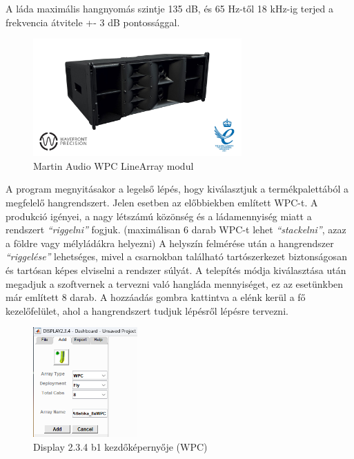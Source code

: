 A láda maximális hangnyomás szintje 135 dB, és 65 Hz-től 18 kHz-ig terjed a frekvencia átvitele +- 3 dB pontossággal. \cite{WPCUSERGUIDE}
\begin{figure}[H]
	\centering
	\includegraphics[width=80mm, keepaspectratio]{figures/wpc_front_view.jpg}
	\caption{Martin Audio WPC LineArray modul}\label{fig:wpc}
\end{figure}
A program megnyitásakor a legelső lépés, hogy kiválasztjuk a termékpalettából a megfelelő hangrendszert.
Jelen esetben az előbbiekben említett WPC-t. A produkció igényei, a nagy létszámú közönség és a ládamennyiség miatt a rendszert
\textit{``riggelni''} fogjuk. (maximálisan 6 darab WPC-t lehet \textit{``stackelni''}, azaz a földre vagy mélyládákra helyezni)
A helyszín felmérése után a hangrendszer \textit{``riggelése''} lehetséges, mivel a csarnokban található tartószerkezet biztonságosan
és tartósan képes elviselni a rendszer súlyát.
A telepítés módja kiválasztása után megadjuk a szoftvernek a tervezni való hangláda mennyiséget, ez az esetünkben már említett 8 darab.
A hozzáadás gombra kattintva a elénk kerül a fő kezelőfelület, ahol a hangrendszert tudjuk lépésről lépésre tervezni.
\begin{figure}[H]
	\centering
	\includegraphics[width=40mm, keepaspectratio]{figures/display_wpc_0.png}
	\caption{Display 2.3.4 b1 kezdőképernyője (WPC)}\label{fig:display_wpc_0}
\end{figure}
